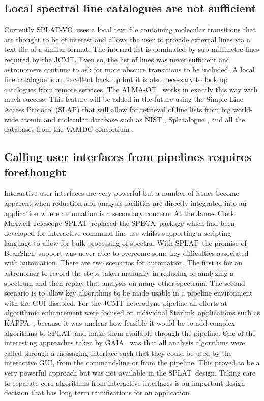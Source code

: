 \documentclass[final,authoryear,5p,times,twocolumn]{elsarticle}
\newcommand{\splat}{\textsf{\small SPLAT}}
\newcommand{\splatvo}{{\textsf{\small{SPLAT-VO}}}}
\newcommand{\gaia}{\textsf{\small GAIA}}
\newcommand{\KAPPA}{\textsf{\small KAPPA}}
\newcommand{\specx}{\textsf{\small SPECX}}
\newcommand{\Starlink}{\textsf{\small Starlink}}
\newcommand{\almaot}{\textsf{\small ALMA-OT}}
\newcommand{\beanshell}{\textsf{\small BeanShell}}
\newcommand{\ascl}[1]{\href{http://www.ascl.net/#1}{ascl:#1}}
\begin{document}
\subsection{Local spectral line catalogues are not sufficient}
%
Currently \splatvo\ uses a local text file containing molecular transitions
that are thought to be of interest and allows the user to provide external
lines via a text file of a similar format. The internal list is dominated by
sub-millimetre lines required by the JCMT. Even so, the list of lines was never
sufficient and astronomers continue to ask for more obscure transitions to be
included. A local line catalogue is an excellent back up but it is also
necessary to look up catalogues from remote services. The \almaot\
\citep{2013ASPC..475..373W} works in exactly this way with much success. This
feature will be added in the future using the Simple Line Access Protocol
(SLAP) that will allow for retrieval of line lists from big world-wide atomic
and molecular database such as NIST
\citep{NIST_ASD,2012APS..DMP.D1004K,2004JPCRD..33..177L}, Splatalogue
\citep{2010AAS...21547905R}, and all the databases from the VAMDC consortium
\citep{2011BaltA..20..503K}.


\subsection{Calling user interfaces from pipelines requires forethought}
%
Interactive user interfaces are very powerful but a number of issues become
apparent when reduction and analysis facilities are directly integrated into an
application where automation is a secondary concern.  At the James Clerk
Maxwell Telescope \splat\ replaced the \specx\ package
\citep[][\ascl{1310.008}]{specx} which had been developed for interactive
command-line use whilst supporting a scripting language to allow for bulk
processing of spectra. With \splat\ the promise of \beanshell\ support was
never able to overcome some key difficulties associated with automation. There
are two scenarios for automation. The first is for an astronomer to record the
steps taken manually in reducing or analyzing a spectrum and then replay that
analysis on many other spectrum. The second scenario is to allow key algorithms
to be made usable in a pipeline environment with the GUI disabled. For the JCMT
heterodyne pipeline
\citep[][\ascl{1310.001}]{2008ASPC..394..565J,JennessACSISDR} all efforts at
algorithmic enhancement were focused on individual \Starlink\ applications such
as \KAPPA\ \citep[][\ascl{1403.022}]{sun95}, because it was unclear how
feasible it would be to add complex algorithms to \splat\ and make them
available through the pipeline. One of the interesting approaches taken by
\gaia\ \citep{2009ASPC..411..575D} was that all analysis algorithms were called
through a messaging interface such that they could be used by the interactive
GUI, from the command-line or from the pipeline. This proved to be a very
powerful approach but was not available in the \splat\ design. Taking care to
separate core algorithms from interactive interfaces is an important design
decision that has long term ramifications for an application.
\end{document}
